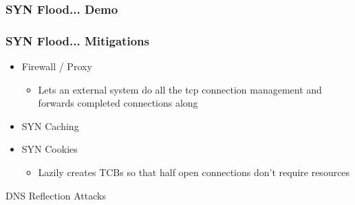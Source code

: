 \documentclass{beamer}
\begin{document}
\begin{frame}
	\frametitle{SYN Flood... Demo}
\end{frame}

\begin{frame}
	\frametitle{SYN Flood... Mitigations}
	\begin{itemize}
		\item Firewall / Proxy
			\begin{itemize}
				\item Lets an external system do all the tcp connection management and
					forwards completed connections along
			\end{itemize}
		\item SYN Caching
		\item SYN Cookies
			\begin{itemize}
				\item Lazily creates TCBs so that half open connections don't require
					resources
			\end{itemize}
	\end{itemize}
\end{frame}

\begin{frame}{DNS Reflection Attacks}

\end{frame}
\end{document}
